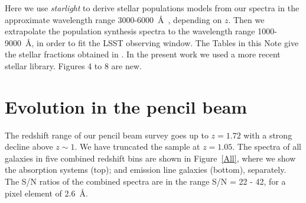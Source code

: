 \documentclass[referee]{aa}
\begin{document}
Here we use {\it starlight} to derive stellar populations models from our spectra in the approximate wavelength range 3000-6000~\AA ~, depending on
$z$. Then we extrapolate the population synthesis spectra to the wavelength range 1000-9000~\AA, in order to fit the
LSST observing window. The Tables in this Note give the stellar fractions obtained in \citep{Giraud:2011}. In the present work we
used a more recent stellar library. Figures 4 to 8 are new.


\section{Evolution in the pencil beam}
\label{evolution}

 The redshift range of our pencil beam survey goes up to $z = 1.72$ with a strong decline
above $z \sim 1$. We have truncated the sample at $z = 1.05$.
The spectra of all galaxies in five combined redshift bins are shown in  Figure~\ref{All}, where we show the
absorption systems (top); and emission line galaxies (bottom), separately. \rm 
The S/N ratios of the combined spectra are in the range S/N = 22 - 42, for a 
pixel element of  2.6~\AA. 

\end{document}
